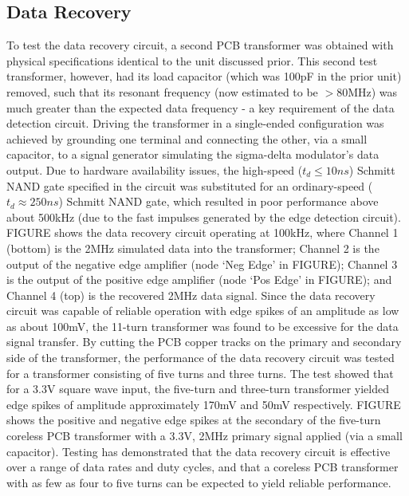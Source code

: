 \documentclass[conference]{IEEEtran}
\begin{document}
	\subsection{Data Recovery}
	To test the data recovery circuit, a second PCB transformer was obtained with physical specifications identical to the unit discussed prior.  This second test transformer, however, had its load capacitor (which was 100pF in the prior unit) removed, such that its resonant frequency (now estimated to be $>$80MHz) was much greater than the expected data frequency - a key requirement of the data detection circuit.  Driving the transformer in a single-ended configuration was achieved by grounding one terminal and connecting the other, via a small capacitor, to a signal generator simulating the sigma-delta modulator's data output.  Due to hardware availability issues, the high-speed ($ t_{d} \leq 10ns $) Schmitt NAND gate specified in the circuit was substituted for an ordinary-speed ($ t_{d} \approx 250ns $) Schmitt NAND gate, which resulted in poor performance above about 500kHz (due to the fast impulses generated by the edge detection circuit).  FIGURE shows the data recovery circuit operating at 100kHz, where Channel 1 (bottom) is the 2MHz simulated data into the transformer; Channel 2 is the output of the negative edge amplifier (node `Neg Edge' in FIGURE); Channel 3 is the output of the positive edge amplifier (node `Pos Edge' in FIGURE); and Channel 4 (top) is the recovered 2MHz data signal.
	Since the data recovery circuit was capable of reliable operation with edge spikes of an amplitude as low as about 100mV, the 11-turn transformer was found to be excessive for the data signal transfer.  By cutting the PCB copper tracks on the primary and secondary side of the transformer, the performance of the data recovery circuit was tested for a transformer consisting of five turns and three turns.  The test showed that for a 3.3V square wave input, the five-turn and three-turn transformer yielded edge spikes of amplitude approximately 170mV and 50mV respectively.  FIGURE shows the positive and negative edge spikes at the secondary of the five-turn coreless PCB transformer with a 3.3V, 2MHz primary signal applied (via a small capacitor).  Testing has demonstrated that the data recovery circuit is effective over a range of data rates and duty cycles, and that a coreless PCB transformer with as few as four to five turns can be expected to yield reliable performance.
	
\end{document}
